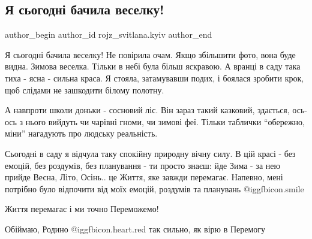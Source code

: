  
 
 
 
 
 
\subsection{Я сьогодні бачила веселку!}
\label{sec:01_12_2022.fb.rojz_svitlana.kyiv.1.veselka}
 
\ifcmt
 author_begin
   author_id rojz_svitlana.kyiv
 author_end
\fi

Я сьогодні бачила веселку! Не повірила очам. Якщо збільшити фото, вона буде
видна. Зимова веселка. Тільки в небі була більш яскравою. А вранці в саду така
тиха - ясна -  сильна краса. Я стояла, затамувавши подих, і боялася зробити
крок, щоб слідами не зашкодити білому полотну. 

А навпроти школи доньки - сосновий ліс. Він зараз такий казковий, здається,
ось-ось з нього вийдуть чи чарівні гноми, чи зимові феї. Тільки таблички
\enquote{обережно, міни} нагадують про людську реальність.

Сьогодні в саду я відчула таку спокійну природну вічну силу. В цій красі - без
емоцій, без роздумів, без планування - ти просто знаєш: йде Зима - за нею
прийде Весна, Літо, Осінь.. це Життя, яке завжди перемагає. Напевно, мені
потрібно було відпочити від моїх емоцій, роздумів та планувань  @igg{fbicon.smile}  

Життя перемагає і ми точно Переможемо!

Обіймаю, Родино @igg{fbicon.heart.red} так сильно, як вірю в Перемогу

